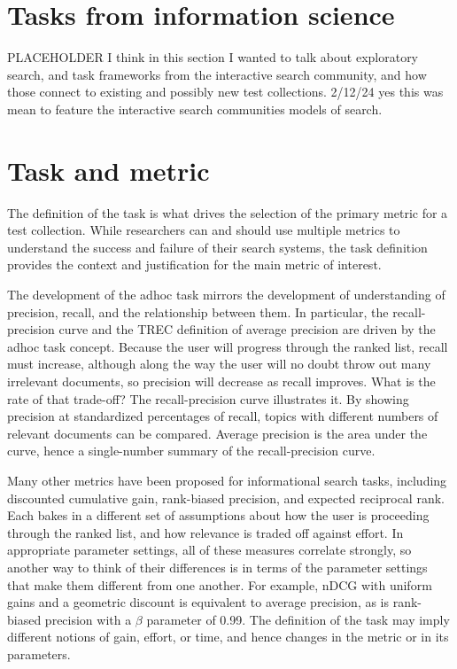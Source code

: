 \documentclass[nobib]{tufte-book}
\begin{document}
\section{Tasks from information science}

PLACEHOLDER I think in this section I wanted to talk about exploratory search, and task frameworks from the interactive search community, and how those connect to existing and possibly new test collections.  2/12/24 yes this was mean to feature the interactive search communities models of search.

\section{Task and metric}

The definition of the task is what drives the selection of the primary metric for a test collection.  While researchers can and should use multiple metrics to understand the success and failure of their search systems, the task definition provides the context and justification for the main metric of interest.

The development of the adhoc task mirrors the development of understanding of precision, recall, and the relationship between them.  In particular, the recall-precision curve and the TREC definition of average precision are driven by the adhoc task concept.  Because the user will progress through the ranked list, recall must increase, although along the way the user will no doubt throw out many irrelevant documents, so precision will decrease as recall improves.  What is the rate of that trade-off?  The recall-precision curve illustrates it.  By showing precision at standardized percentages of recall, topics with different numbers of relevant documents can be compared.  Average precision is the area under the curve, hence a single-number summary of the recall-precision curve.

Many other metrics have been proposed for informational search tasks, including discounted cumulative gain, rank-biased precision, and expected reciprocal rank.  Each bakes in a different set of assumptions about how the user is proceeding through the ranked list, and how relevance is traded off against effort.  In appropriate parameter settings, all of these measures correlate strongly, so another way to think of their differences is in terms of the parameter settings that make them different from one another.  For example, nDCG with uniform gains and a geometric discount is equivalent to average precision, as is rank-biased precision with a $\beta$ parameter of 0.99.  The definition of the task may imply different notions of gain, effort, or time, and hence changes in the metric or in its parameters.
\end{document}
